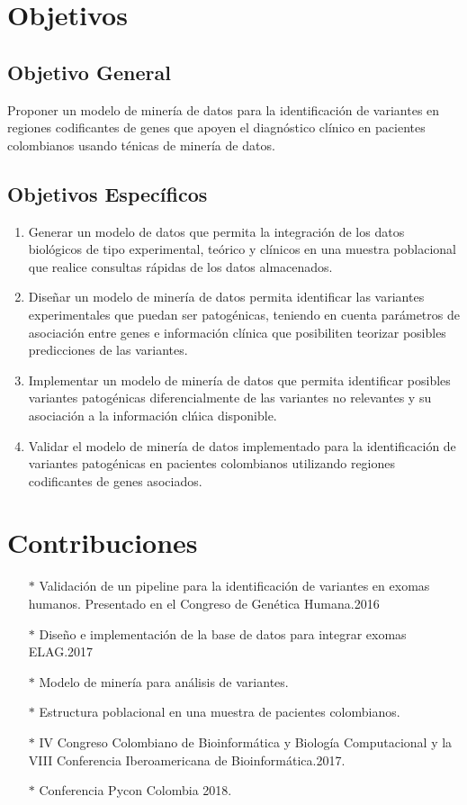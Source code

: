 \section*{Objetivos}

\subsection*{Objetivo General}%

Proponer un modelo de miner\'ia de datos para la identificaci\'on de variantes en regiones codificantes de genes  que apoyen el  diagn\'ostico cl\'inico en pacientes colombianos usando t\'enicas de miner\'ia de datos.


\subsection*{Objetivos Espec\'ificos}

\begin{enumerate}
	\item Generar un modelo de datos que permita la integraci\'on de los datos biol\'ogicos de tipo experimental, te\'orico y cl\'inicos en una  muestra poblacional que realice consultas r\'apidas de los datos almacenados.
	\item Dise\~nar un modelo de miner\'ia de datos permita identificar las variantes experimentales que puedan ser patog\'enicas, teniendo en cuenta par\'ametros de asociaci\'on entre genes e informaci\'on cl\'inica que posibiliten teorizar posibles predicciones de las variantes. 
	\item Implementar un  modelo de miner\'ia de datos que permita identificar posibles variantes patog\'enicas diferencialmente de las variantes no relevantes y  su asociaci\'on a la informaci\'on cl\'nica disponible.
	\item Validar el modelo de miner\'ia de datos implementado para la identificaci\'on de variantes patog\'enicas en pacientes colombianos utilizando regiones codificantes de genes asociados.  
\end{enumerate}

\section*{Contribuciones}

\begin{itemize}
	\item[$*$] Validación de un pipeline para la identificación de variantes en exomas humanos. Presentado en el Congreso de Genética Humana.2016
	\item[$*$] Diseño e implementación de la base de datos para integrar exomas ELAG.2017
	\item[$*$] Modelo de minería para análisis de variantes.
	\item[$*$] Estructura poblacional en una muestra de pacientes colombianos.
	\item[$*$] IV Congreso Colombiano de Bioinformática y Biología Computacional y la VIII Conferencia Iberoamericana de Bioinformática.2017.
	\item[$*$] Conferencia Pycon Colombia 2018. 
\end{itemize}

